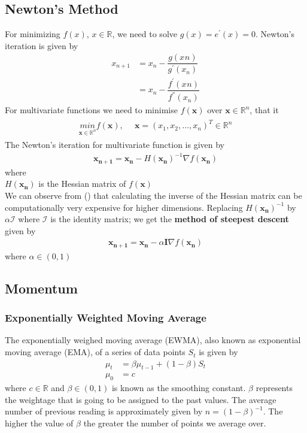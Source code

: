 \subsection{Newton's Method}
For minimizing $f(x)$, $x \in \mathbb{R}$, we need to solve $g(x) = e^{'}(x)=0$. Newton's iteration is given by 
\begin{align}
  x_{n+1} &= x_{n} - \dfrac{g(x_{}n)}{g^{'}(x_n)} \\
          &= x_{n} - \dfrac{f^{'}(x_{}n)}{f^{''}(x_n)}
\end{align}
For multivariate functions we need to minimise $f(\mathbf{x})$ over $\mathbf{x} \in \mathbb{R}^n$, that it
\begin{align}
  \begin{matrix}
    \underset{\mathbf{x}\in\mathbb{R}^n}{min} f(\mathbf{x}), & \,\,\, \mathbf{x} =(x_1,x_2,\dots,x_n)^T \in \mathbb{R}^n
  \end{matrix} 
\end{align}
The Newton's iteration for multivariate function is given by
\begin{align}
  \mathbf{x_{n+1}} = \mathbf{x_{n}} - H(\mathbf{x_n})^{-1}\nabla f(\mathbf{x_n})
\end{align}
where\\
\indent $H(\mathbf{x_n})$ is the Hessian matrix of $f(\mathbf{x})$\\
\noindent We can observe from () that calculating the inverse of the Hessian matrix can be computationally very expensive for higher dimensions. Replacing $H(\mathbf{x_n})^{-1}$ by $\alpha \mathcal{I}$ where $\mathcal{I}$ is the identity matrix; we get the \textbf{method of steepest descent} given by
\begin{align}
  \mathbf{x_{n+1}} = \mathbf{x_{n}} - \alpha \textbf{I} \nabla f(\mathbf{x_n})
\end{align}
where $\alpha \in (0,1)$
\subsection{Momentum}
\subsubsection*{Exponentially Weighted Moving Average}
The exponentially weighed moving average (EWMA), also known as exponential moving average (EMA), of a series of data points $S_t$ is given by 
\begin{align}
    \label{eq:ewma_def}
    \mu_t &= \beta \mu_{t-1} + (1-\beta)S_t \\
    \nonumber
    \mu_0 &= c
\end{align}
where $c \in \mathbb{R}$ and $\beta \in (0,1)$ is known as the smoothing constant. $\beta$ represents the weightage that is going to be assigned to the past values. The average number of previous reading is approximately given by $n={(1-\beta)}^{-1}$. The higher the value of $\beta$ the greater the number of points we average over.
